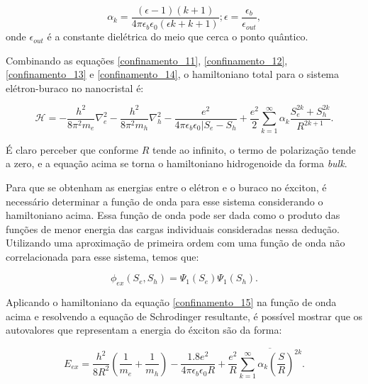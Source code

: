 \begin{equation}
	\label{confinamento_14}
	\alpha_{k} = \frac{(\epsilon-1)(k+1)}{4\pi \epsilon_{b} \epsilon_{0}(\epsilon k + k + 1)}; \epsilon = \frac{\epsilon_{b}}{\epsilon_{out}},
\end{equation}
onde $\epsilon_{out}$ é a constante dielétrica do meio que cerca o ponto quântico.

\par Combinando as equações \eqref{confinamento_11}, \eqref{confinamento_12}, \eqref{confinamento_13} e \eqref{confinamento_14}, o hamiltoniano total para o sistema elétron-buraco no nanocristal é:

\begin{equation}
	\label{confinamento_15}
	\mathcal{H} = - \frac{h^2}{8\pi^2 m_{e}}\nabla_{e}^2 - \frac{h^2}{8\pi^2m_{h}}\nabla_{h}^2 - \frac{e^2}{4\pi \epsilon_{b}\epsilon_{0}|S_{e} - S_{h}} + \frac{e^2}{2} \sum_{k=1}^\infty \alpha_{k} \frac{S_{e}^{2k} + S_{h}^{2k}}{R^{2k+1}}.
\end{equation}

\par É claro perceber que conforme $R$ tende ao infinito, o termo de polarização tende a zero, e a equação acima se torna o hamiltoniano hidrogenoide da forma \textit{bulk}. 

\par Para que se obtenham as energias entre o elétron e o buraco no éxciton, é necessário determinar a função de onda para esse sistema considerando o hamiltoniano acima. Essa função de onda pode ser dada como o produto das funções de menor energia das cargas individuais consideradas nessa dedução. Utilizando uma aproximação de primeira ordem com uma função de onda não correlacionada para esse sistema, temos que:

\begin{equation}
	\label{confinamento_16}
	\phi_{ex}(S_{e}, S_{h}) = \Psi_{1}(S_{e})\Psi_{1}(S_{h}).
\end{equation}

\par Aplicando o hamiltoniano da equação \eqref{confinamento_15} na função de onda acima e resolvendo a equação de Schrodinger resultante, é possível mostrar que os autovalores que representam a energia do éxciton são da forma:

\begin{equation}
	\label{confinamento_17}
	E_{ex} = \frac{h^2}{8R^2}\left(\frac{1}{m_{e}} + \frac{1}{m_{h}} \right) - \frac{1.8e^2}{4\pi\epsilon_{b}\epsilon_{0}R} + \frac{e^2}{R} \overline{\sum_{k=1}^{\infty} \alpha_{k} \left(\frac{S}{R} \right)^{2k}}.
\end{equation}

